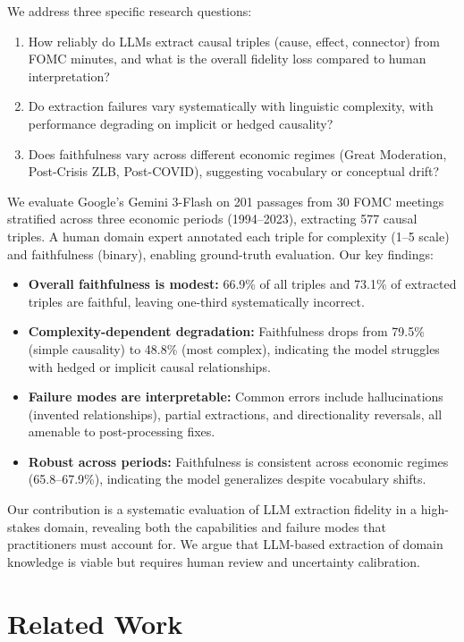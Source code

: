 \documentclass[11pt]{article}
\begin{document}
We address three specific research questions:
\begin{enumerate}
    \item How reliably do LLMs extract causal triples (cause, effect, connector) from FOMC minutes, and what is the overall fidelity loss compared to human interpretation?
    \item Do extraction failures vary systematically with linguistic complexity, with performance degrading on implicit or hedged causality?
    \item Does faithfulness vary across different economic regimes (Great Moderation, Post-Crisis ZLB, Post-COVID), suggesting vocabulary or conceptual drift?
\end{enumerate}

We evaluate Google's Gemini 3-Flash on 201 passages from 30 FOMC meetings stratified across three economic periods (1994--2023), extracting 577 causal triples. A human domain expert annotated each triple for complexity (1--5 scale) and faithfulness (binary), enabling ground-truth evaluation. Our key findings:

\begin{itemize}
    \item \textbf{Overall faithfulness is modest:} 66.9\% of all triples and 73.1\% of extracted triples are faithful, leaving one-third systematically incorrect.
    \item \textbf{Complexity-dependent degradation:} Faithfulness drops from 79.5\% (simple causality) to 48.8\% (most complex), indicating the model struggles with hedged or implicit causal relationships.
    \item \textbf{Failure modes are interpretable:} Common errors include hallucinations (invented relationships), partial extractions, and directionality reversals, all amenable to post-processing fixes.
    \item \textbf{Robust across periods:} Faithfulness is consistent across economic regimes (65.8--67.9\%), indicating the model generalizes despite vocabulary shifts.
\end{itemize}

Our contribution is a systematic evaluation of LLM extraction fidelity in a high-stakes domain, revealing both the capabilities and failure modes that practitioners must account for. We argue that LLM-based extraction of domain knowledge is viable but requires human review and uncertainty calibration.

\section{Related Work}
\end{document}
